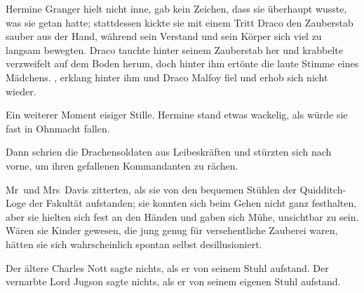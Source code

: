 Hermine Granger hielt nicht inne, gab kein Zeichen, dass sie überhaupt wusste, was sie getan hatte; stattdessen kickte sie mit einem Tritt Draco den Zauberstab sauber aus der Hand, während sein Verstand und sein Körper sich viel zu langsam bewegten. Draco tauchte hinter seinem Zauberstab her und krabbelte verzweifelt auf dem Boden herum, doch hinter ihm ertönte die laute Stimme eines Mädchens. , erklang hinter ihm und Draco Malfoy fiel und erhob sich nicht wieder.

Ein weiterer Moment eisiger Stille. Hermine stand etwas wackelig, als würde sie fast in Ohnmacht fallen.

Dann schrien die Drachensoldaten aus Leibeskräften und stürzten sich nach vorne, um ihren gefallenen Kommandanten zu rächen.

\later

Mr~und Mrs~Davis zitterten, als sie von den bequemen Stühlen der Quidditch-Loge der Fakultät aufstanden; sie konnten sich beim Gehen nicht ganz festhalten, aber sie hielten sich fest an den Händen und gaben sich Mühe, unsichtbar zu sein. Wären sie Kinder gewesen, die jung genug für versehentliche Zauberei waren, hätten sie sich wahrscheinlich spontan selbst desillusioniert.

Der ältere Charles Nott sagte nichts, als er von seinem Stuhl aufstand. Der vernarbte Lord Jugson sagte nichts, als er von seinem eigenen Stuhl aufstand.

